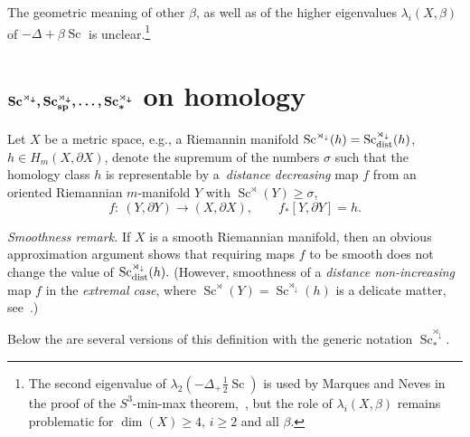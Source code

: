\documentclass[10pt,a4paper]{amsart}
\numberwithin{equation}{section}
\begin{document}
The geometric meaning of other $\beta$, as well
as of the higher eigenvalues $\lambda_i(X,\beta) $ of $-\Delta + \beta \operatorname{Sc}$ is unclear.\footnote{The second eigenvalue of $\lambda_2(-\Delta_ + \frac{1}{2} \operatorname{Sc})$ is used by Marques and Neves in the proof of the $S^3$-min-max theorem,~\cite{MN2011}, but the role of $\lambda_i(X,\beta) $ remains problematic for $\dim(X)\geq 4$,
 $i\geq 2$ and all $\beta$.}

\section[Sc\^{}\{rtimes downarrow\}, Sc\_\{sp\}\^{}\{rtimes downarrow\}, ..., Sc\^{}\{rtimes downarrow\}\_\{ast\} on homology]{$\boldsymbol{\operatorname{Sc}^{\rtimes_\downarrow}, \operatorname{Sc}_{\rm sp}^{\rtimes_\downarrow}, \dots, \operatorname{Sc}^{\rtimes_\downarrow}_\ast}$ on homology}\label{section2}

 Let $X$ be a metric space, e.g., a Riemannin manifold $\operatorname{Sc}^{\rtimes_\downarrow}(h)=\operatorname{Sc}_{\rm dist}^{\rtimes_\downarrow}(h)$, $h\in H_m(X,\partial X)$, denote the supremum of the numbers $\sigma$ such that
the homology class $h$ is representable by
 a~{\it distance decreasing} map $f$ from an oriented Riemannian $m$-manifold $Y$ with $\operatorname{Sc}^\rtimes (Y) \geq \sigma$,
\[
f\colon \ (Y,\partial Y)\to (X, \partial X), \qquad
 f_\ast [Y,\partial Y]=h.
 \]

{\it Smoothness remark.} If $X$ is a smooth Riemannian manifold, then an obvious approximation argument shows that requiring maps $f$ to be smooth does not change the
value of $\operatorname{Sc}_{\rm dist}^{\rtimes_\downarrow}(h).$
(However, smoothness of a {\it distance non-increasing} map $f$ in the {\it extremal case}, where $\operatorname{Sc}^\rtimes (Y) =\operatorname{Sc}^{\rtimes_\downarrow}(h)$ is a delicate matter, see~\cite{CHS2023}.)

Below the are several versions of this definition with the generic notation $\operatorname{Sc}^{\rtimes_\downarrow}_\ast$.
\end{document}
